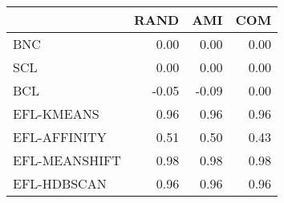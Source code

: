 \begin{tabular}{lrrr}
\toprule
 & RAND & AMI & COM \\
\midrule
BNC & 0.00 & 0.00 & 0.00 \\
SCL & 0.00 & 0.00 & 0.00 \\
BCL & -0.05 & -0.09 & 0.00 \\
EFL-KMEANS & 0.96 & 0.96 & 0.96 \\
EFL-AFFINITY & 0.51 & 0.50 & 0.43 \\
EFL-MEANSHIFT & 0.98 & 0.98 & 0.98 \\
EFL-HDBSCAN & 0.96 & 0.96 & 0.96 \\
\bottomrule
\end{tabular}
